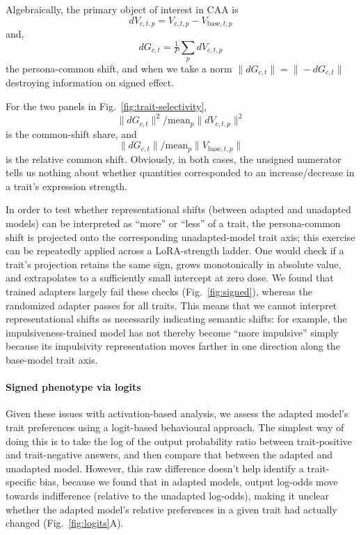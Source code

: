\documentclass{article}
\begin{document}
Algebraically, the primary object of interest in CAA is
\[
dV_{c,t,p} = V_{c,t,p}-V_{\mathrm{base},t,p}
\]
and,
\[
dG_{c,t} = \tfrac{1}{P}\sum_{p}dV_{c,t,p}
\]
the persona-common shift, and when we take a norm $\|dG_{c,t}\| = \|-dG_{c,t}\|$ destroying information on signed effect.

For the two panels in Fig.~\ref{fig:trait-selectivity},
\[
\|dG_{c,t}\|^2\big/\mathrm{mean}_p\|dV_{c,t,p}\|^2
\]
is the common-shift share, and
\[
\|dG_{c,t}\|\big/\mathrm{mean}_p\|V_{\mathrm{base},t,p}\|
\]
is the relative common shift. Obviously, in both cases, the unsigned numerator tells us nothing about whether quantities corresponded to an increase/decrease in a trait's expression strength.

In order to test whether representational shifts (between adapted and unadapted models) can be interpreted as “more” or “less” of a trait, the persona-common shift is projected onto the corresponding unadapted-model trait axis; this exercise can be repeatedly applied across a LoRA-strength ladder. One would check if a trait's projection retains the same sign, grows monotonically in absolute value, and extrapolates to a sufficiently small intercept at zero dose. We found that trained adapters largely fail these checks (Fig.~\ref{fig:signed}), whereas the randomized adapter passes for all traits. This means that we cannot interpret representational shifts as necessarily indicating semantic shifts: for example, the impulsiveness-trained model has not thereby become “more impulsive” simply because its impulsivity representation moves farther in one direction along the base-model trait axis.  

\paragraph{Signed phenotype via logits} Given these issues with activation-based analysis, we assess the adapted model's trait preferences using a logit-based behavioural approach. The simplest way of doing this is to take the log of the output probability ratio between trait-positive and trait-negative answers, and then compare that between the adapted and unadapted model. However, this raw difference doesn't help identify a trait-specific bias, because we found that in adapted models, output log-odds move towards indifference (relative to the unadapted log-odds), making it unclear whether the adapted model's relative preferences in a given trait had actually changed (Fig.~\ref{fig:logits}A). 
\end{document}
